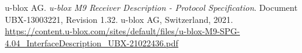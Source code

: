 \documentclass[../DoAn.tex]{subfiles}
\begin{document}
\begin{thebibliography}{9}
u-blox AG. \textit{u-blox M9 Receiver Description - Protocol Specification}. Document UBX-13003221, Revision 1.32. u-blox AG, Switzerland, 2021.\\
\url{https://content.u-blox.com/sites/default/files/u-blox-M9-SPG-4.04_InterfaceDescription_UBX-21022436.pdf}
\end{thebibliography}
\end{document}
